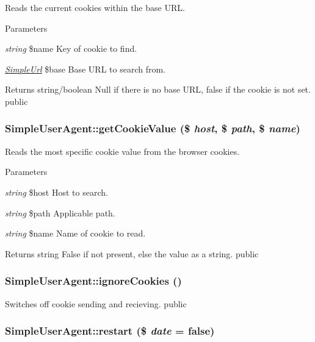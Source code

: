\label{class_simple_user_agent_a4f6c882450bd4f5b89564dd468f95187}
Reads the current cookies within the base URL. 
\begin{DoxyParams}{Parameters}
\item[{\em string}]\$name Key of cookie to find. \item[{\em \hyperlink{class_simple_url}{SimpleUrl}}]\$base Base URL to search from. \end{DoxyParams}
\begin{DoxyReturn}{Returns}
string/boolean Null if there is no base URL, false if the cookie is not set.  public 
\end{DoxyReturn}
\hypertarget{class_simple_user_agent_a5036fd8466a5f4231bc2d9be29b47cff}{
\subsubsection[{getCookieValue}]{\setlength{\rightskip}{0pt plus 5cm}SimpleUserAgent::getCookieValue (\$ {\em host}, \/  \$ {\em path}, \/  \$ {\em name})}}
\label{class_simple_user_agent_a5036fd8466a5f4231bc2d9be29b47cff}
Reads the most specific cookie value from the browser cookies. 
\begin{DoxyParams}{Parameters}
\item[{\em string}]\$host Host to search. \item[{\em string}]\$path Applicable path. \item[{\em string}]\$name Name of cookie to read. \end{DoxyParams}
\begin{DoxyReturn}{Returns}
string False if not present, else the value as a string.  public 
\end{DoxyReturn}
\hypertarget{class_simple_user_agent_ab8a0d45899a60bb8b0f947ba3a9e9a91}{
\subsubsection[{ignoreCookies}]{\setlength{\rightskip}{0pt plus 5cm}SimpleUserAgent::ignoreCookies ()}}
\label{class_simple_user_agent_ab8a0d45899a60bb8b0f947ba3a9e9a91}
Switches off cookie sending and recieving.  public \hypertarget{class_simple_user_agent_a332656f2f3bab01a7a25c9ce28dc6995}{
\subsubsection[{restart}]{\setlength{\rightskip}{0pt plus 5cm}SimpleUserAgent::restart (\$ {\em date} = {\ttfamily false})}}
